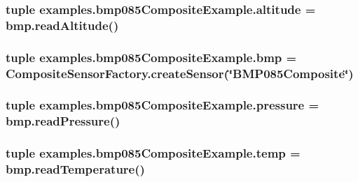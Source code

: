 \subsubsection[{altitude}]{\setlength{\rightskip}{0pt plus 5cm}tuple examples.\+bmp085\+Composite\+Example.\+altitude = bmp.\+read\+Altitude()}\label{namespaceexamples_1_1bmp085CompositeExample_a834f047b7853b170a5ad2e7e702b6dae}
\hypertarget{namespaceexamples_1_1bmp085CompositeExample_aa0c7787fb240423d23138aa954c87a0d}{}
\subsubsection[{bmp}]{\setlength{\rightskip}{0pt plus 5cm}tuple examples.\+bmp085\+Composite\+Example.\+bmp = {\bf Composite\+Sensor\+Factory.\+create\+Sensor}(\char`\"{}B\+M\+P085\+Composite\char`\"{})}\label{namespaceexamples_1_1bmp085CompositeExample_aa0c7787fb240423d23138aa954c87a0d}
\hypertarget{namespaceexamples_1_1bmp085CompositeExample_a229ab88a16a5d1120285622bedfe4b16}{}
\subsubsection[{pressure}]{\setlength{\rightskip}{0pt plus 5cm}tuple examples.\+bmp085\+Composite\+Example.\+pressure = bmp.\+read\+Pressure()}\label{namespaceexamples_1_1bmp085CompositeExample_a229ab88a16a5d1120285622bedfe4b16}
\hypertarget{namespaceexamples_1_1bmp085CompositeExample_aeac9716741eb5f58eebaa31e659516ad}{}
\subsubsection[{temp}]{\setlength{\rightskip}{0pt plus 5cm}tuple examples.\+bmp085\+Composite\+Example.\+temp = bmp.\+read\+Temperature()}\label{namespaceexamples_1_1bmp085CompositeExample_aeac9716741eb5f58eebaa31e659516ad}
